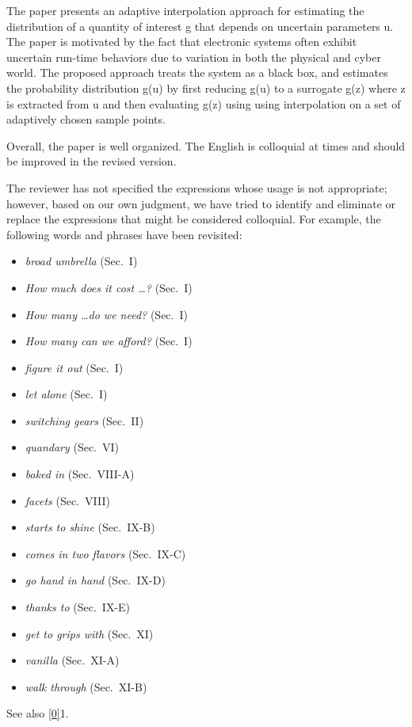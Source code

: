 \begin{reviewer}
The paper presents an adaptive interpolation approach for estimating the
distribution of a quantity of interest g that depends on uncertain parameters u.
The paper is motivated by the fact that electronic systems often  exhibit
uncertain run-time behaviors due to variation in both the physical and cyber
world. The proposed approach treats the system as a black box, and estimates the
probability distribution g(u) by first reducing g(u) to a surrogate g(z) where z
is extracted from u and then evaluating g(z) using using interpolation on a set
of adaptively chosen sample points.

Overall, the paper is well organized. The English is colloquial at times and
should be improved in the revised version.
\end{reviewer}

\begin{authors}
The reviewer has not specified the expressions whose usage is not appropriate;
however, based on our own judgment, we have tried to identify and eliminate or
replace the expressions that might be considered colloquial. For example, the
following words and phrases have been revisited:

\begin{itemize}
  \item \emph{broad umbrella} (Sec.~I)
  \item \emph{How much does it cost \dots?} (Sec.~I)
  \item \emph{How many \dots do we need?} (Sec.~I)
  \item \emph{How many can we afford?} (Sec.~I)
  \item \emph{figure it out} (Sec.~I)
  \item \emph{let alone} (Sec.~I)
  \item \emph{switching gears} (Sec.~II)
  \item \emph{quandary} (Sec.~VI)
  \item \emph{baked in} (Sec.~VIII-A)
  \item \emph{facets} (Sec.~VIII)
  \item \emph{starts to shine} (Sec.~IX-B)
  \item \emph{comes in two flavors} (Sec.~IX-C)
  \item \emph{go hand in hand} (Sec.~IX-D)
  \item \emph{thanks to} (Sec.~IX-E)
  \item \emph{get to grips with} (Sec.~XI)
  \item \emph{vanilla} (Sec.~XI-A)
  \item \emph{walk through} (Sec.~XI-B)
\end{itemize}

See also \cref{0}{1}.

\begin{actions}
\end{actions}
\end{authors}

